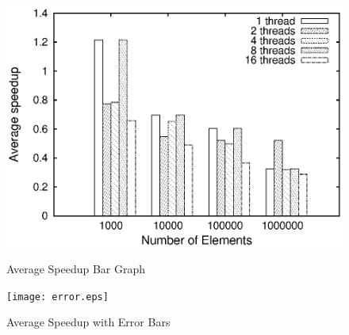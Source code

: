\documentclass[a4paper, 10pt]{report}
\begin{document}
\begin{figure}
\centering
\includegraphics[width=0.7\columnwidth]{bar.eps}
 \caption{Average Speedup Bar Graph}
 \label{fig:Bar Graph for Average Speedup}
\centering
\texttt{[image: error.eps]}
 \caption{Average Speedup with Error Bars}
 \label{fig:Average Speedup Bar Graph with Errors}
\end{figure}
\end{document}
